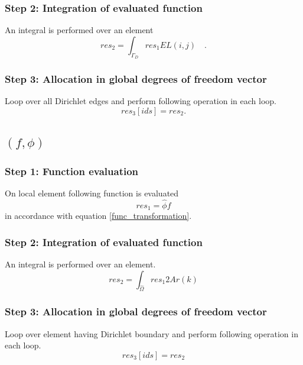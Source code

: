 \documentclass[a4paper,openany]{book}
\begin{document}
\subsubsection{Step 2: Integration of evaluated function}

An integral is performed over an element 
\begin{equation}
res_2 = \int_{\Gamma_D} res_1 EL(i,j) \quad \textrm{.}
\end{equation}

\subsubsection{Step 3: Allocation in global degrees of freedom vector}

Loop over all Dirichlet edges and perform following operation in each loop.
\begin{equation}
res_3[ids]=res_2.
\end{equation}

\subsection{$(f,\phi) $}

\subsubsection{Step 1: Function evaluation}

On local element following function is evaluated 
\begin{equation}
res_1 = \hat{\phi} f
\end{equation} 
in accordance with equation \eqref{func_transformation}.\\

\subsubsection{Step 2: Integration of evaluated function}
An integral is performed over an element.
\begin{equation}
res_2 = \int_{\hat{\Omega}} res_1 2 Ar(k)
\end{equation}

\subsubsection{Step 3: Allocation in global degrees of freedom vector}

Loop over element having Dirichlet boundary and perform following operation in each loop.
\begin{equation}
res_3[ids]=res_2
\end{equation}
\end{document}
